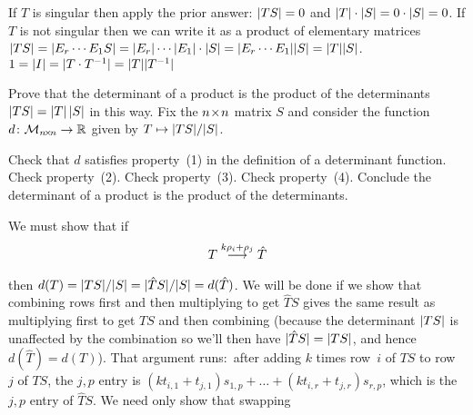 \begin{exercises}
\begin{answer}
\begin{exparts}
        \partsitem If \( T \) is singular then apply the prior answer:
          \( \deter{TS}=0 \) and
          \( \deter{T}\cdot\deter{S}=0\cdot\deter{S}=0 \).
          If \( T \) is not singular then we can write it as a product of
          elementary matrices
          $
            \deter{TS}=\deter{E_r\cdots E_1S}=
            \deter{E_r}\cdots\deter{E_1}\cdot\deter{S}=
            \deter{E_r\cdots E_1}\deter{S}=\deter{T}\deter{S}
          $.
        \partsitem \( 1=\deter{I}=\deter{T\cdot T^{-1}}
                     =\deter{T}\deter{T^{-1}} \)
      \end{exparts}  
     \end{answer} 
  \item 
    Prove that the determinant of a product is the product of the
    determinants \( \deter{TS}=\deter{T}\,\deter{S} \) in this way.
    Fix the \( n \! \times \! n \) matrix \( S \) and consider the function
    \( \mbox{$d\colon \mathcal{M}_{n \! \times \! n}\to \mathbb{R}$} \) given by
    \( T\mapsto \deter{TS}/\deter{S} \).
    \begin{exparts}
      \partsitem Check that \( d \) satisfies property~(1) in the definition of
        a determinant function.
      \partsitem Check property~(2).
      \partsitem Check property~(3).
      \partsitem Check property~(4).
      \partsitem Conclude the determinant of a product is the product of the
        determinants.
    \end{exparts}
    \begin{answer}
      \begin{exparts}
        \partsitem We must show that if
          \begin{equation*}
            T\mathrel{ \mathop{\longrightarrow}\limits^{k\rho_i+\rho_j\mathstrut}_{ \begin{subarray}{l} \relax \end{subarray}}}\hat{T}
          \end{equation*}
          then $d(T)=\deter{TS}/\deter{S}
          =\deter{\hat{T}S}/\deter{S}=d(\hat{T})$.
          We will be done if we show that combining rows first and
          then multiplying to get \( \hat{T}S \) gives the same result as
          multiplying first to get \( TS \) and then combining
          (because the determinant \( \deter{TS} \) is unaffected by the
          combination so we'll then have \( \deter{\hat{T}S}=\deter{TS} \), and
          hence \( d(\hat{T})=d(T) \)).
          That argument runs:~after adding 
          \( k \) times row~\( i \) of \( TS \) to
          row~$j$ of \( TS \), the \( j,p \) entry is
          \( (kt_{i,1}+t_{j,1})s_{1,p}+\dots+(kt_{i,r}+t_{j,r})s_{r,p} \),
          which is the \( j,p \) entry of \( \hat{T}S \).
        \partsitem We need only show that swapping

\end{exparts}
\end{answer}
\end{exercises}
